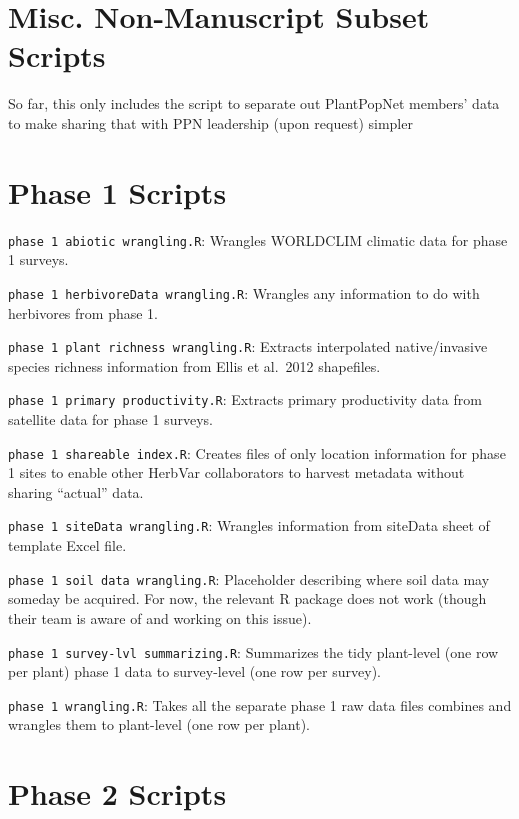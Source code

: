\documentclass[
  letterpaper,
  oneside,
  open=any]{scrbook}
\begin{document}
\section{Misc. Non-Manuscript Subset
Scripts}\label{misc.-non-manuscript-subset-scripts}

So far, this only includes the script to separate out PlantPopNet
members' data to make sharing that with PPN leadership (upon request)
simpler

\section{Phase 1 Scripts}\label{phase-1-scripts}

\texttt{phase\ 1\ abiotic\ wrangling.R}: Wrangles WORLDCLIM climatic
data for phase 1 surveys.

\texttt{phase\ 1\ herbivoreData\ wrangling.R}: Wrangles any information
to do with herbivores from phase 1.

\texttt{phase\ 1\ plant\ richness\ wrangling.R}: Extracts interpolated
native/invasive species richness information from Ellis et al.~2012
shapefiles.

\texttt{phase\ 1\ primary\ productivity.R}: Extracts primary
productivity data from satellite data for phase 1 surveys.

\texttt{phase\ 1\ shareable\ index.R}: Creates files of only location
information for phase 1 sites to enable other HerbVar collaborators to
harvest metadata without sharing ``actual'' data.

\texttt{phase\ 1\ siteData\ wrangling.R}: Wrangles information from
siteData sheet of template Excel file.

\texttt{phase\ 1\ soil\ data\ wrangling.R}: Placeholder describing where
soil data may someday be acquired. For now, the relevant R package does
not work (though their team is aware of and working on this issue).

\texttt{phase\ 1\ survey-lvl\ summarizing.R}: Summarizes the tidy
plant-level (one row per plant) phase 1 data to survey-level (one row
per survey).

\texttt{phase\ 1\ wrangling.R}: Takes all the separate phase 1 raw data
files combines and wrangles them to plant-level (one row per plant).

\section{Phase 2 Scripts}\label{phase-2-scripts}
\end{document}
